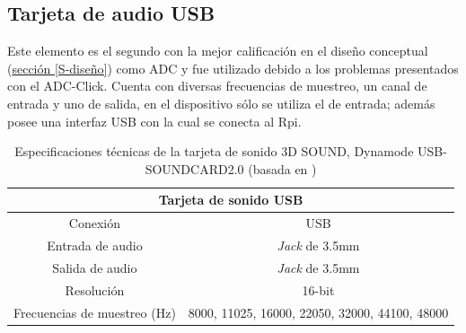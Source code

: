 \documentclass[11pt,lettersize]{article} %
\newcommand{\seccion}[1]{\hyperref[{#1}]{sección \ref*{#1}}}
\begin{document}
\subsection{Tarjeta de audio USB}
\label{S-audio-usb}
Este elemento es el segundo con la mejor calificación en el diseño conceptual (\seccion{S-diseño}) como ADC y fue utilizado debido a los problemas presentados con el ADC-Click. Cuenta con diversas frecuencias de muestreo, un canal de entrada y uno de salida, en el dispositivo sólo se utiliza el de entrada; además posee una interfaz USB con la cual se conecta al Rpi.
\begin{table}[H]
	\begin{center}
		\begin{tabular}{|c|c|}
			\hline
			\multicolumn{2}{|c|}{Tarjeta de sonido USB}\\ \hline
			Conexión & USB\\ \hline
			Entrada de audio & \textit{Jack} de 3.5mm\\ \hline
			Salida de audio & \textit{Jack} de 3.5mm\\ \hline
			Resolución & 16-bit \\ \hline
			Frecuencias de muestreo (Hz) & 8000, 11025, 16000, 22050, 32000, 44100, 48000\\ \hline
		\end{tabular}
	\end{center}
	\caption[Especificaciones técnicas de la tarjeta de sonido 3D SOUND]{Especificaciones técnicas de la tarjeta de sonido 3D SOUND, Dynamode USB-SOUNDCARD2.0 (basada en \cite{Dynamode})}
	\label{T-audio-usb}
\end{table}
\end{document}
